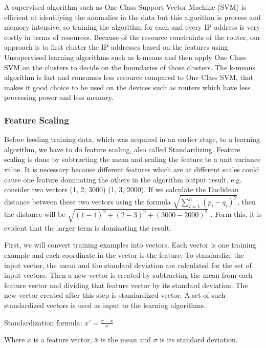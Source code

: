 \documentclass[12pt,oneside,a4paper]{article}
\begin{document}
A supervised algorithm such as One Class Support Vector Machine (SVM)\cite{svm} is efficient at identifying the anomalies in the data but this algorithm is process and memory intensive, so training the algorithm for each and every IP address is very costly in terms of resources. Because of the resource constraints of the router, our approach is to first cluster the IP addresses based on the features using Unsupervised learning algorithms such as k-means and then apply One Class SVM on the clusters to decide on the boundaries of those clusters. The k-means algorithm is fast and consumes less resource compared to One Class SVM, that makes it good choice to be used on the devices such as routers which have less processing power and less memory.

\subsubsection{Feature Scaling}

Before feeding training data, which was acquired in an earlier stage, to a learning algorithm, we have to do feature scaling, also called Standardizing. Feature scaling is done by subtracting the mean and scaling the feature to a unit variance value. It is necessary because  different features which are at different scales could cause one feature dominating the others in the algorithm output result. e.g. consider two vectors (1, 2, 3000) (1, 3, 2000). If we calculate the Euclidean distance between these two vectors using the formula $\sqrt{\sum_{i=1}^n (p_i - q_i)^2}$, then the distance will be $\sqrt{(1-1)^2 + (2-3)^2 + (3000-2000)^2}$ . Form this, it is evident that the larger term is dominating the result.

First, we will convert training examples into vectors. Each vector is one training example and each coordinate in the vector is the feature. To standardize the input vector, the mean and the standard deviation are calculated for the set of input vectors. Then a new vector is created by subtracting the mean from each feature vector and dividing that feature vector by its standard deviation. The new vector created after this step is standardized vector. A set of such standardized vectors is used as input to the learning algorithms.

\hspace{2cm} Standardization formula: $x' = \frac{x - \bar{x}}{\sigma}$

Where $x$ is a feature vector, ${\bar{x}}$ is the mean and $\sigma$  is its standard deviation.
\end{document}
